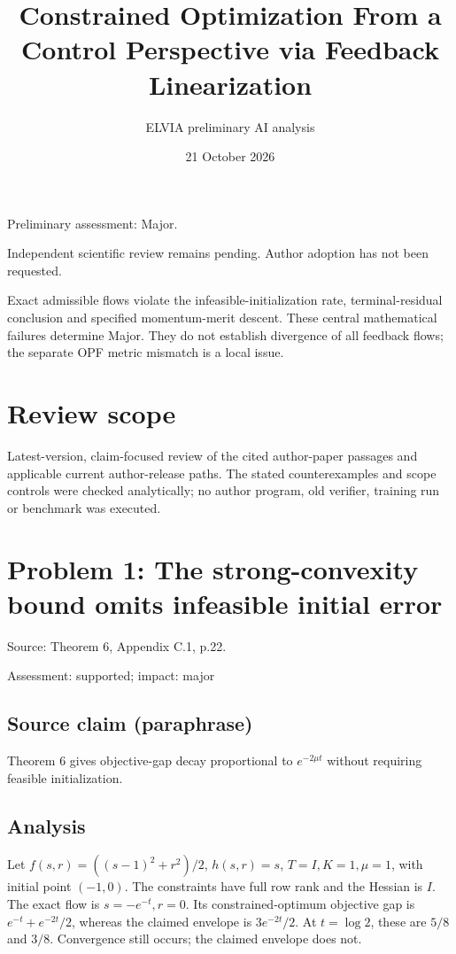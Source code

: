 \documentclass[11pt]{article}
\begin{document}
\title{Constrained Optimization From a Control Perspective via Feedback Linearization}

\author{ELVIA preliminary AI analysis}\date{21 October 2026}\maketitle

Preliminary assessment: Major.\par

Independent scientific review remains pending. Author adoption has not been requested.

Exact admissible flows violate the infeasible-initialization rate, terminal-residual conclusion and specified momentum-merit descent. These central mathematical failures determine Major. They do not establish divergence of all feedback flows; the separate OPF metric mismatch is a local issue.

\section*{Review scope}

Latest-version, claim-focused review of the cited author-paper passages and applicable current author-release paths. The stated counterexamples and scope controls were checked analytically; no author program, old verifier, training run or benchmark was executed.

\section*{Problem 1: The strong-convexity bound omits infeasible initial error}

Source: Theorem 6, Appendix C.1, p.22.

Assessment: supported; impact: major

\subsection*{Source claim (paraphrase)}

Theorem 6 gives objective-gap decay proportional to \(e^{-2\mu t}\) without requiring feasible initialization.

\subsection*{Analysis}

Let \(f(s,r)=((s-1)^2+r^2)/2\), \(h(s,r)=s\), \(T=I,K=1,\mu=1\), with initial point \((-1,0)\). The constraints have full row rank and the Hessian is \(I\). The exact flow is \(s=-e^{-t},r=0\). Its constrained-optimum objective gap is \(e^{-t}+e^{-2t}/2\), whereas the claimed envelope is \(3e^{-2t}/2\). At \(t=\log2\), these are \(5/8\) and \(3/8\). Convergence still occurs; the claimed envelope does not.
\end{document}
